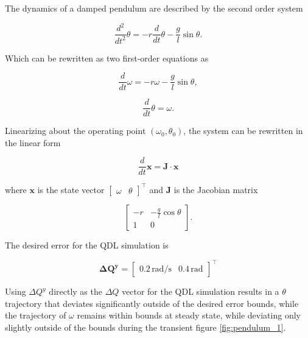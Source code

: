 The dynamics of a damped pendulum are described by the second order system

\begin{equation} \label{eq:pendulum1}
\frac{d^2}{dt^2} \theta = -r \frac{d}{dt} \theta -\frac{g}{l} \sin{\theta}.
\end{equation}

Which can be rewritten as two first-order equations as

\begin{equation} \label{eq:pendulum_omega}
\frac{d}{dt} \omega = -r \omega - \frac{g}{l} \sin{\theta},
\end{equation}

\begin{equation} \label{eq:pendulum_theta}
\frac{d}{dt} \theta = \omega.
\end{equation}

Linearizing about the operating point $( \omega_0, \theta_0 )$, the system can be rewritten in the linear form

\begin{equation} \label{eq:pendulum_linearize}
\frac{d}{dt} \mathbf{x} = \mathbf{J} \cdot \mathbf{x} 
\end{equation}

where $\mathbf{x}$ is the state vector $\begin{bmatrix} \omega & \theta \end{bmatrix}^\top$ and $\mathbf{J}$  is the Jacobian matrix

\begin{equation} \label{eq:pendulum_jac}
\begin{bmatrix}
-r & -\frac{g}{l} \cos{\theta} \\
1 & 0
\end{bmatrix}.
\end{equation}

The desired error for the QDL simulation is

\begin{equation} \label{eq:pendulum_dqy}
\mathbf{\Delta Q^y} =
\begin{bmatrix}
0.2 \,\text{rad/s} & 0.4 \,\text{rad}
\end{bmatrix}^\top
\end{equation}

Using $\Delta Q^y$ directly as the $\Delta Q$ vector for the QDL simulation results in a $\theta$ trajectory that deviates significantly outside of the desired error bounds, while the trajectory of $\omega$ remains within bounds at steady state, while deviating only slightly outside of the bounds during the transient figure \ref{fig:pendulum_1}.

